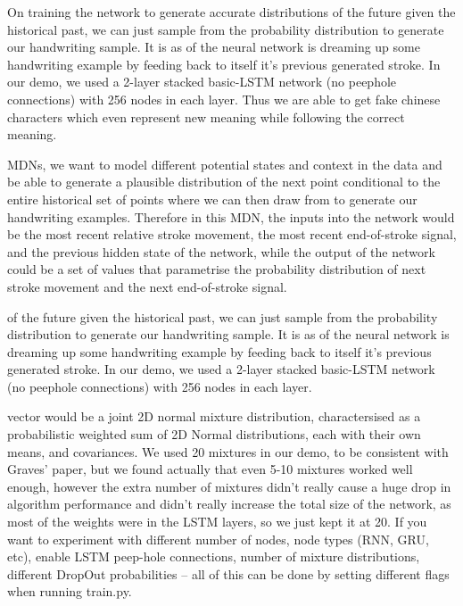 \documentclass[12pt]{report}
\begin{document}
On training the network to generate accurate distributions of the
future given the historical past, we can just sample from the
probability distribution to generate our handwriting sample. It is as
of the neural network is dreaming up some handwriting example by
feeding back to itself it’s previous generated stroke. In our demo, we
used a 2-layer stacked basic-LSTM network (no peephole connections)
with 256 nodes in each layer. Thus we are able to get fake chinese
characters which even represent new meaning while following the
correct meaning.


MDNs, we want to model different potential states and context in the
data and be able to generate a plausible distribution of the next
point conditional to the entire historical set of points where we can
then draw from to generate our handwriting examples. Therefore in this
MDN, the inputs into the network would be the most recent relative
stroke movement, the most recent end-of-stroke signal, and the
previous hidden state of the network, while the output of the network
could be a set of values that parametrise the probability distribution
of next stroke movement and the next end-of-stroke signal.

of the future given the historical past, we can just sample from the
probability distribution to generate our handwriting sample. It is as
of the neural network is dreaming up some handwriting example by
feeding back to itself it’s previous generated stroke. In our demo, we
used a 2-layer stacked basic-LSTM network (no peephole connections)
with 256 nodes in each layer.

vector would be a joint 2D normal mixture distribution, charactersised
as a probabilistic weighted sum of 2D Normal distributions, each with
their own means, and covariances. We used 20 mixtures in our demo, to
be consistent with Graves’ paper, but we found actually that even 5-10
mixtures worked well enough, however the extra number of mixtures
didn’t really cause a huge drop in algorithm performance and didn’t
really increase the total size of the network, as most of the weights
were in the LSTM layers, so we just kept it at 20. If you want to
experiment with different number of nodes, node types (RNN, GRU, etc),
enable LSTM peep-hole connections, number of mixture distributions,
different DropOut probabilities – all of this can be done by setting
different flags when running train.py.
\end{document}
